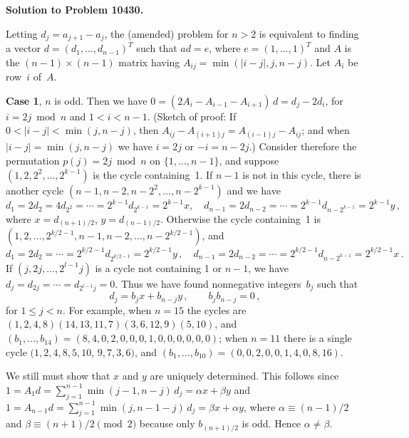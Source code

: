\magnification\magstephalf
\parskip 5pt
\def\adx#1:#2\par{\par{}\par}

{\baselineskip14pt

{\bf Solution to Problem 10430.}\quad
[The problem should be amended to state that $a_1\leq \cdots\leq a_n$.
Otherwise there would be, for example, infinitely many dissimilar balanced
sequences $(0,-1,x,0)$ when $n=4$.]


Letting $d_j=a_{j+1}-a_j$, the (amended) problem for $n>2$ is equivalent to
finding a vector $d=(d_1,\ldots,d_{n-1})^T$ such that $ad=e$, where
$e=(1,\ldots,1)^T$ and $A$ is the $(n-1)\times(n-1)$ matrix having
$A_{ij}=\min(\vert i-j\vert,j,n-j)$. Let $A_i$ be row~$i$ of~$A$.

\medskip
{\bf Case 1}, $n$ is odd. Then we have $0=(2A_i-A_{i-1}-A_{i+1})\,
d=d_j-2d_i$, for $i=2j\bmod n$ and $1<i<n-1$. 
(Sketch of proof: If $0<\vert i-j\vert <\min(j,n-j)$, then
$A_{ij}-A_{(i+1)j}=A_{(i-1)j}-A_{ij}$; and when $\vert i-j\vert=\min(j,n-j)$ we
have $i=2j$ or $-i=n-2j$.)
Consider therefore the permutation $p(j)=2j\bmod n$ on $\{1,\ldots,n-1\}$, and
suppose $(1,2,2^2,\ldots,2^{k-1})$ is the cycle containing~1. If $n-1$ is not
in this cycle, there is another cycle $(n-1,n-2,n-2^2,\ldots,n-2^{k-1})$ and we
have
$$d_1=2d_2=4d_{2^2}=\cdots=2^{k-1}d_{2^{k-1}}=2^{k-1}x, \quad
d_{n-1}=2d_{n-2}=\cdots =2^{k-1}d_{n-2^{k-1}}=2^{k-1}y\,,$$
where $x=d_{(n+1)/2}$, $y=d_{(n-1)/2}$. Otherwise the cycle containing~1 is
$(1,2,\ldots,2^{k/2-1},n-1,\allowbreak 
n-2,\ldots,n-2^{k/2-1})$, and 
$$d_1=2d_2=\cdots=2^{k/2-1}d_{2^{k/2-1}}=2^{k/2-1}y\,,\quad
d_{n-1}=2d_{n-2}=\cdots=2^{k/2-1}d_{n-2^{k-1}}=2^{k/2-1}x\,.$$
If $(j,2j,\ldots,2^{l-1}j)$ is a cycle not containing 1 or $n-1$, we have
$d_j=d_{2j}=\cdots =d_{2^{l-1}j}=0$. Thus we have found nonnegative
integers~$b_j$ such that
$$d_j=b_jx+b_{n-j}y\,,\qquad b_jb_{n-j}=0\,,$$
for $1\leq j<n$. For example, when $n=15$ the cycles are $(1,2,4,8)(14,13,11,7)
(3,6,12,9)(5,10)$, and $(b_1,\ldots,b_{14})=
(8,4,0,2,0,0,0,1,0,0,0,0,0,0)$; when $n=11$ there is a single cycle
$(1,2,4,8,5,10$,
$9,7,3,6)$, and $(b_1,\ldots,b_{10})=(0,0,2,0,0,1,4,0,8,16)$.

We still must show that $x$ and $y$ are uniquely determined. This follows since
$1=A_1d=\sum_{j=1}^{n-1}\min(j-1,n-j)\,d_j=\alpha x+\beta y$ and
$1=A_{n-1}d=\sum_{j=1}^{n-1}\min(j,n-1-j)\,d_j=\beta x+\alpha y$, where
$\alpha\equiv(n-1)/2$ and $\beta\equiv(n+1)/2 \pmod 2$ because only
$b_{(n+1)/2}$ is odd. Hence $\alpha\neq \beta$.

}
